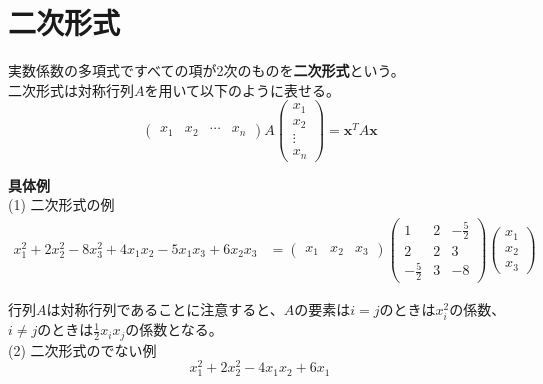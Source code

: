 \documentclass{jlreq}
\begin{document}
\section{二次形式}

\begin{tcolorbox}[enhanced,title=定義2 二次形式, 
  attach boxed title to top left, 
  colback=white!95!blue,
  colbacktitle=white!10!blue!50!black,
  drop fuzzy shadow,
  boxrule=0.25mm,
  ]
  実数係数の多項式ですべての項が2次のものを\textbf{二次形式}という。 \\
  二次形式は対称行列$A$を用いて以下のように表せる。 
  \begin{equation*}
    \left(
      \begin{matrix}
        x_1 & x_2 & \cdots & x_n
      \end{matrix}
    \right)
    A
    \left(
      \begin{matrix}
        x_1 \\
        x_2 \\
        \vdots \\
        x_n
      \end{matrix}
    \right) = \boldsymbol{x}^T A \boldsymbol{x}
  \end{equation*}
\end{tcolorbox}

\textbf{具体例} \\
(1) 二次形式の例 \\
\begin{align*}
  x_1^2 + 2 x_2 ^2 - 8 x_3 ^2 + 4 x_1 x_2 - 5 x_1 x_3 + 6 x_2 x_3 
  &= \begin{pmatrix}
    x_1 & x_2 & x_3
  \end{pmatrix}
  \begin{pmatrix}
    1 & 2 & - \frac{5}{2} \\
    2 & 2 & 3 \\
    - \frac{5}{2} & 3 & -8
  \end{pmatrix}
  \begin{pmatrix}
    x_1 \\
    x_2 \\
    x_3
  \end{pmatrix}
\end{align*}

行列$A$は対称行列であることに注意すると、$A$の要素は$i = j$のときは$x_i^2$の係数、$i \neq j$のときは$\frac{1}{2}x_i x_j$の係数となる。 \\

(2) 二次形式のでない例 \\
\begin{equation*}
  x_1^2 + 2 x_2^2 - 4x_1 x_2 + 6 x_1
\end{equation*}
\end{document}

